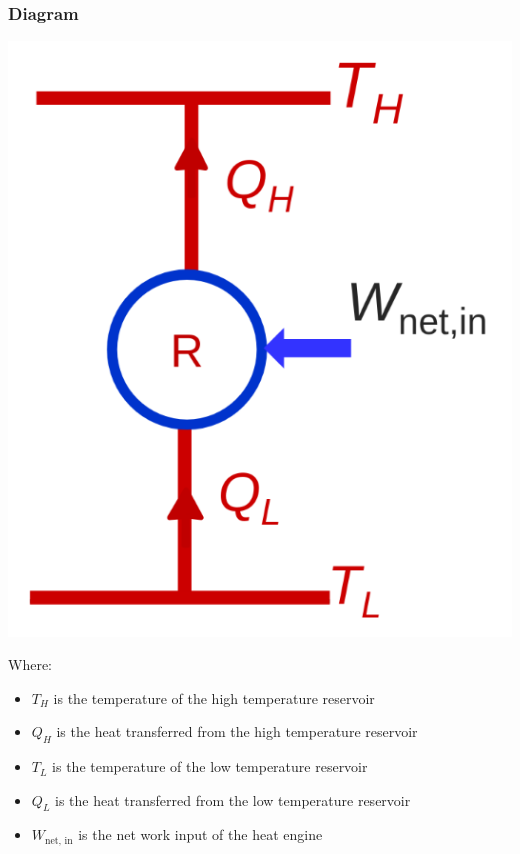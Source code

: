 \documentclass[11pt]{article}
\begin{document}
\subsubsection{Diagram}
\label{sec:org10d67da}
\begin{center}
\includegraphics[scale=1.1]{./images/reverse-heat-engine-diagram.png}
\end{center}

Where:
\begin{itemize}
\item \(T_H\) is the temperature of the high temperature reservoir
\item \(Q_H\) is the heat transferred from the high temperature reservoir
\item \(T_L\) is the temperature of the low temperature reservoir
\item \(Q_L\) is the heat transferred from the low temperature reservoir
\item \(W_{\text{net, in}}\) is the net work input of the heat engine
\end{itemize}
\end{document}
